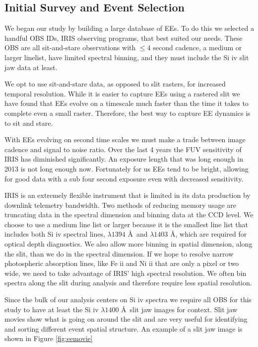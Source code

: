 \documentclass[]{aastex6}
\begin{document}
	\subsection{Initial Survey and Event Selection}
	We began our study by building a large database of EEs.  To do this we selected a handful OBS IDs, IRIS observing programs, that best suited our needs.  These OBS are all sit-and-stare observations with $\leq 4$ second cadence, a medium or larger linelist, have limited spectral binning, and they must include the Si {\sc iv} slit jaw data at least.   
	
	We opt to use sit-and-stare data, as opposed to slit rasters, for increased temporal resolution.  While it is easier to capture EEs using a rastered slit we have found that EEs evolve on a timescale much faster than the time it takes to complete even a small raster.  Therefore, the best way to capture EE dynamics is to sit and stare.  
	
	With EEs evolving on second time scales we must make a trade between image cadence and signal to noise ratio.  Over the last 4 years the FUV sensitivity of IRIS has diminished significantly.  An exposure length that was long enough in 2013 is not long enough now.  Fortunately for us EEs tend to be bright, allowing for good data with a sub four second exposure even with decreased sensitivity.  
	
	IRIS is an extremely flexible instrument that is limited in its data production by downlink telemetry bandwidth.  Two methods of reducing memory usage are truncating data in the spectral dimension and binning data at the CCD level.  We choose to use a medium line list or larger because it is the smallest line list that includes both Si {\sc iv}  spectral lines, $\lambda 1394$ \AA\  and $\lambda 1403$ \AA, which are required for optical depth diagnostics.  We also allow more binning in spatial dimension, along the slit, than we do in the spectral dimension. If we hope to resolve narrow photospheric absorption lines, like Fe {\sc ii} and Ni {\sc ii} that are only a pixel or two wide, we need to take advantage of IRIS' high spectral resolution.  We often bin spectra along the slit during analysis and therefore require less spatial resolution.
	
	Since the bulk of our analysis centers on Si {\sc iv} spectra we require all OBS for this study to have at least the Si {\sc iv} $\lambda1400$ \AA \ slit jaw images for context.  Slit jaw movies show what is going on around the slit and are very useful for identifying and sorting different event spatial structure. An example of a slit jaw image is shown in Figure \ref{fig:eemovie}
	
\end{document}
